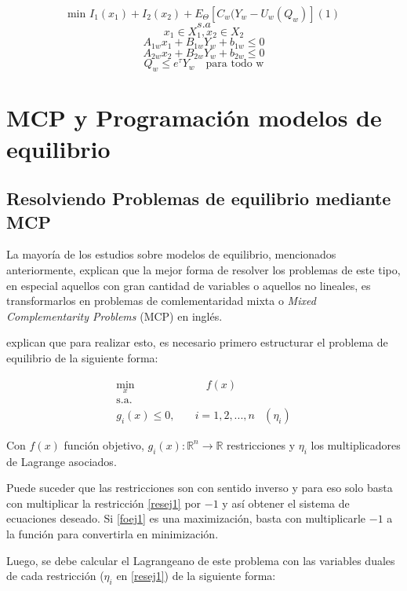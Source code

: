 $$ \text{min } I_{1}(x_{1})+ I_{2}(x_{2})+E_{\Theta}[C_{w}(Y_{w}-U_{w}(Q_{w})] (1)$$
$$s.a$$
$$ x_{1} \in X_{1} ,x_{2} \in X_{2}$$
$$A_{1w}x_{1}+B_{1w}Y_{w}+b_{1w} \le 0 $$
$$A_{2w}x_{2}+B_{2w}Y_{w}+b_{2w} \le 0 $$
$$Q_{w}\le e^{\tau}Y_{w}\text{  }\text{ para todo w}$$



\section{MCP y Programación modelos de equilibrio}

\subsection{Resolviendo Problemas de equilibrio mediante MCP}\label{descripcionkkt}

La mayoría de los estudios sobre modelos de equilibrio, mencionados anteriormente, explican que la mejor forma de resolver los problemas de este tipo, en especial aquellos con gran cantidad de variables o aquellos no lineales, es transformarlos en problemas de comlementaridad mixta o \textit{Mixed Complementarity Problems} (MCP) en inglés.
\vspace{2.5mm}

 explican que para realizar esto, es necesario primero estructurar el problema de equilibrio  de la siguiente forma:

\begin{align}
    \min_{x} & \quad f(x) \label{foej1}\\ 
    \textrm{s.a.} \nonumber\\
    g_{i}(x) \leq 0 ,\quad & i=1,2,...,n  &(\eta_{i}) \label{resej1} 
\end{align}

Con $f(x)$ función objetivo,  $g_{i}(x):\mathbb{R}^n \rightarrow \mathbb{R}$ restricciones y $\eta_i$ los multiplicadores de Lagrange asociados. 
\vspace{2.5mm}

Puede suceder que las restricciones son con sentido inverso y para eso solo basta con multiplicar la restricción \ref{resej1} por $-1$ y así obtener el sistema de ecuaciones deseado. Si \ref{foej1} es una maximización, basta con multiplicarle $-1$ a la función para convertirla en minimización.
\vspace{2.5mm}

Luego, se debe calcular el Lagrangeano de este problema con las variables duales de cada restricción ($\eta_{i}$ en \ref{resej1}) de la siguiente forma:

